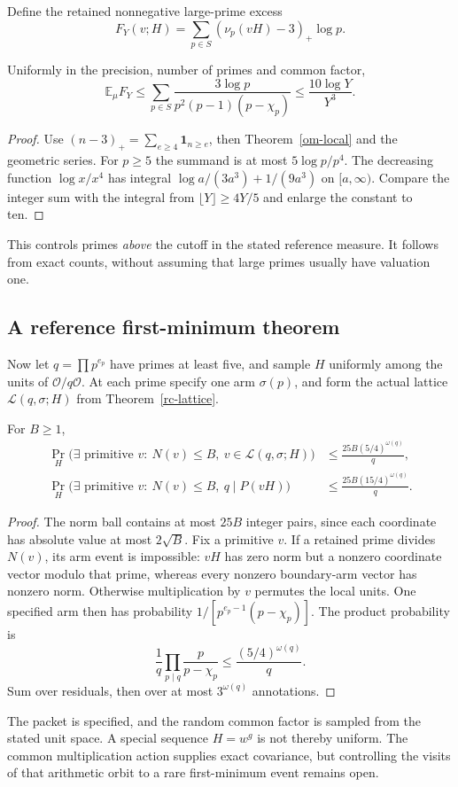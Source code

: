 Define the retained nonnegative large-prime excess
\[
 F_Y(v;H)=\sum_{p\in S}(\nu_p(vH)-3)_+\log p.
\]
\begin{theorem}\label{om-mean}
Uniformly in the precision, number of primes and common factor,
\[
 \mathbb E_\mu F_Y
 \le\sum_{p\in S}\frac{3\log p}{p^2(p-1)(p-\chi_p)}
 \le\frac{10\log Y}{Y^3}.
\]
\end{theorem}
\begin{proof}
Use $(n-3)_+=\sum_{e\ge4}\mathbf1_{n\ge e}$, then
Theorem~\ref{om-local} and the geometric series. For $p\ge5$ the summand
is at most $5\log p/p^4$. The decreasing function $\log x/x^4$ has integral
$\log a/(3a^3)+1/(9a^3)$ on $[a,\infty)$. Compare the integer sum with
the integral from $\lfloor Y\rfloor\ge4Y/5$ and enlarge the constant to ten.
\end{proof}
This controls primes \emph{above} the cutoff in the stated reference measure.
It follows from exact counts, without assuming that large primes usually
have valuation one.

\subsection{A reference first-minimum theorem}
Now let $q=\prod p^{e_p}$ have primes at least five, and sample $H$ uniformly
among the units of $\mathcal O/q\mathcal O$. At each prime specify one arm
$\sigma(p)$, and form the actual lattice $\mathcal L(q,\sigma;H)$ from
Theorem~\ref{rc-lattice}.

\begin{theorem}\label{om-minimum}
For $B\ge1$,
\begin{align*}
 \Pr_H\bigl(\exists\text{ primitive }v:\ N(v)\le B,
                     \ v\in\mathcal L(q,\sigma;H)\bigr)
 &\le\frac{25B(5/4)^{\omega(q)}}q,\\
 \Pr_H\bigl(\exists\text{ primitive }v:\ N(v)\le B,
                     \ q\mid P(vH)\bigr)
 &\le\frac{25B(15/4)^{\omega(q)}}q.
\end{align*}
\end{theorem}
\begin{proof}
The norm ball contains at most $25B$ integer pairs, since each coordinate
has absolute value at most $2\sqrt B$. Fix a primitive $v$. If a retained
prime divides $N(v)$, its arm event is impossible: $vH$ has zero norm but
a nonzero coordinate vector modulo that prime, whereas every nonzero
boundary-arm vector has nonzero norm. Otherwise multiplication by $v$
permutes the local units. One specified arm then has probability
$1/[p^{e_p-1}(p-\chi_p)]$. The product probability is
\[
 \frac1q\prod_{p\mid q}\frac p{p-\chi_p}
 \le\frac{(5/4)^{\omega(q)}}q.
\]
Sum over residuals, then over at most $3^{\omega(q)}$ annotations.
\end{proof}
The packet is specified, and the random common factor is sampled from the
stated unit space. A special sequence $H=w^g$ is not thereby uniform. The
common multiplication action supplies exact covariance, but controlling the
visits of that arithmetic orbit to a rare first-minimum event remains open.

